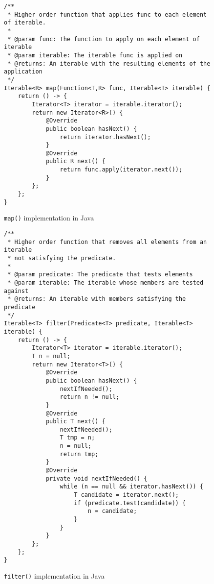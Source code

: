 \documentclass[abstracton,12pt]{scrartcl}
\theoremstyle{definition}
\begin{document}
\begin{figure}[h]
  \begin{framed}
\begin{verbatim}
/**
 * Higher order function that applies func to each element of iterable.
 *
 * @param func: The function to apply on each element of iterable
 * @param iterable: The iterable func is applied on
 * @returns: An iterable with the resulting elements of the application
 */
Iterable<R> map(Function<T,R> func, Iterable<T> iterable) {
    return () -> {
        Iterator<T> iterator = iterable.iterator();
        return new Iterator<R>() {
            @Override
            public boolean hasNext() {
                return iterator.hasNext();
            }
            @Override
            public R next() {
                return func.apply(iterator.next());
            }
        };
    };
}
\end{verbatim}
  \end{framed}
  \caption{\texttt{map()} implementation in Java}
  \label{fig:java_map}
\end{figure}

\begin{figure}[h]
  \begin{framed}
\begin{verbatim}
/**
 * Higher order function that removes all elements from an iterable
 * not satisfying the predicate.
 *
 * @param predicate: The predicate that tests elements
 * @param iterable: The iterable whose members are tested against
 * @returns: An iterable with members satisfying the predicate
 */
Iterable<T> filter(Predicate<T> predicate, Iterable<T> iterable) {
    return () -> {
        Iterator<T> iterator = iterable.iterator();
        T n = null;
        return new Iterator<T>() {
            @Override
            public boolean hasNext() {
                nextIfNeeded();
                return n != null; 
            }
            @Override
            public T next() {
                nextIfNeeded();
                T tmp = n;
                n = null;
                return tmp;
            }
            @Override
            private void nextIfNeeded() {
                while (n == null && iterator.hasNext()) {
                    T candidate = iterator.next();
                    if (predicate.test(candidate)) {
                        n = candidate;
                    }
                }
            }
        };
    };
}
\end{verbatim}
  \end{framed}
  \caption{\texttt{filter()} implementation in Java}
  \label{fig:java_filter}
\end{figure}
\end{document}

